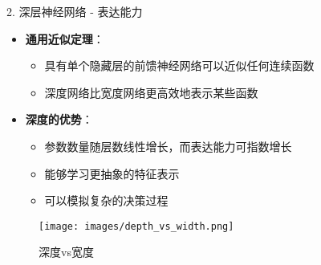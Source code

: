\documentclass[
  ignorenonframetext,
  aspectratio=169,
  chinese-hans,
]{beamer}
\providecommand{\tightlist}{%
  \setlength{\itemsep}{0pt}\setlength{\parskip}{0pt}}\usepackage{longtable,booktabs,array}
\begin{document}
\begin{frame}{2. 深层神经网络 - 表达能力}
\label{ux6df1ux5c42ux795eux7ecfux7f51ux7edc---ux8868ux8fbeux80fdux529b}
\begin{itemize}
\tightlist
\item
  \textbf{通用近似定理}：

  \begin{itemize}
  \tightlist
  \item
    具有单个隐藏层的前馈神经网络可以近似任何连续函数
  \item
    深度网络比宽度网络更高效地表示某些函数
  \end{itemize}
\item
  \textbf{深度的优势}：

  \begin{itemize}
  \tightlist
  \item
    参数数量随层数线性增长，而表达能力可指数增长
  \item
    能够学习更抽象的特征表示
  \item
    可以模拟复杂的决策过程
  \end{itemize}
\end{itemize}

\begin{figure}[H]

{\centering \texttt{[image: images/depth\_vs\_width.png]}

}

\caption{深度vs宽度}

\end{figure}%
\end{frame}
\end{document}

